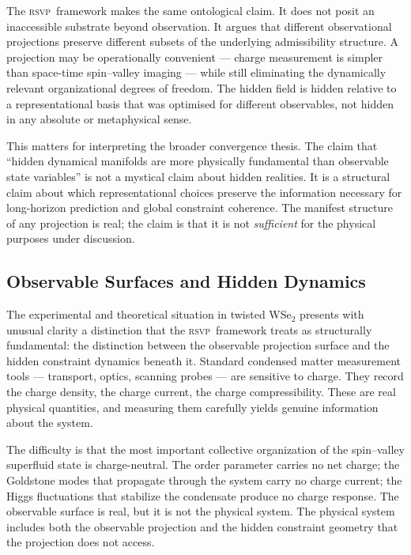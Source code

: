 \documentclass[11pt,a4paper]{article}
\theoremstyle{plain}
\theoremstyle{definition}
\theoremstyle{remark}
\newcommand{\RSVP}{\textup{\textsc{rsvp}}}
\begin{document}
The \RSVP\ framework makes the same ontological claim. It does not posit
an inaccessible substrate beyond observation. It argues that different
observational projections preserve different subsets of the underlying
admissibility structure. A projection may be operationally convenient ---
charge measurement is simpler than space-time spin--valley imaging --- while
still eliminating the dynamically relevant organizational degrees of freedom.
The hidden field is hidden relative to a representational basis that was
optimised for different observables, not hidden in any absolute or
metaphysical sense.

This matters for interpreting the broader convergence thesis. The claim
that ``hidden dynamical manifolds are more physically fundamental than
observable state variables'' is not a mystical claim about hidden realities.
It is a structural claim about which representational choices preserve the
information necessary for long-horizon prediction and global constraint
coherence. The manifest structure of any projection is real; the claim is
that it is not \textit{sufficient} for the physical purposes under discussion.

\subsection{Observable Surfaces and Hidden Dynamics}

The experimental and theoretical situation in twisted WSe$_2$ presents with
unusual clarity a distinction that the \RSVP\ framework treats as
structurally fundamental: the distinction between the observable projection
surface and the hidden constraint dynamics beneath it. Standard condensed
matter measurement tools --- transport, optics, scanning probes ---  are
sensitive to charge. They record the charge density, the charge current, the
charge compressibility. These are real physical quantities, and measuring
them carefully yields genuine information about the system.

The difficulty is that the most important collective organization of the
spin--valley superfluid state is charge-neutral. The order parameter carries
no net charge; the Goldstone modes that propagate through the system carry
no charge current; the Higgs fluctuations that stabilize the condensate
produce no charge response. The observable surface is real, but it is not
the physical system. The physical system includes both the observable
projection and the hidden constraint geometry that the projection does not
access.
\end{document}
